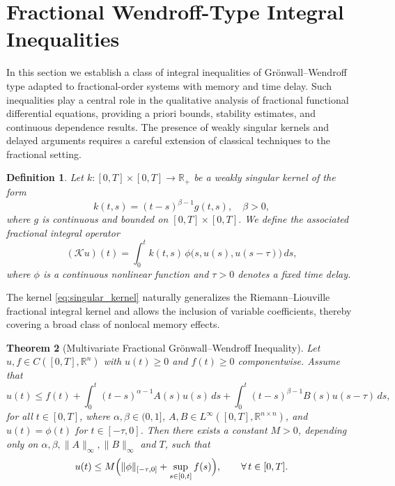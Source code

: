 \documentclass[12pt,a4paper]{article}
\newtheorem{theorem}{Theorem}[section]
\newtheorem{definition}[theorem]{Definition}
\numberwithin{equation}{section}
\begin{document}
	\section{Fractional Wendroff-Type Integral Inequalities}
	\label{sec:inequalities}
	
	In this section we establish a class of integral inequalities of Grönwall--Wendroff type adapted to fractional-order systems with memory and time delay. Such inequalities play a central role in the qualitative analysis of fractional functional differential equations, providing a priori bounds, stability estimates, and continuous dependence results. The presence of weakly singular kernels and delayed arguments requires a careful extension of classical techniques to the fractional setting.
	
	\begin{definition}
		Let $k: [0,T] \times [0,T] \to \mathbb{R}_+$ be a weakly singular kernel of the form
		\begin{equation}
			k(t,s) = (t-s)^{\beta-1} g(t,s), \quad \beta > 0,
			\label{eq:singular_kernel}
		\end{equation}
		where $g$ is continuous and bounded on $[0,T]\times[0,T]$. We define the associated fractional integral operator
		\begin{equation}
			(\mathcal{K}u)(t) = \int_0^t k(t,s)\,\phi\bigl(s,u(s),u(s-\tau)\bigr)\,ds,
			\label{eq:fractional_operator}
		\end{equation}
		where $\phi$ is a continuous nonlinear function and $\tau>0$ denotes a fixed time delay.
	\end{definition}
	
	The kernel \eqref{eq:singular_kernel} naturally generalizes the Riemann--Liouville fractional integral kernel and allows the inclusion of variable coefficients, thereby covering a broad class of nonlocal memory effects.
	
	\begin{theorem}[Multivariate Fractional Grönwall--Wendroff Inequality]
		\label{thm:main_ineq}
		Let $u,f \in C([0,T],\mathbb{R}^n)$ with $u(t)\ge 0$ and $f(t)\ge 0$ componentwise. Assume that
		\begin{equation}
			u(t) \le f(t) + \int_0^t (t-s)^{\alpha-1} A(s)u(s)\,ds + \int_0^t (t-s)^{\beta-1} B(s)u(s-\tau)\,ds,
			\label{eq:inequality_form}
		\end{equation}
		for all $t\in[0,T]$, where $\alpha,\beta\in(0,1]$, $A,B\in L^\infty([0,T],\mathbb{R}^{n\times n})$, and $u(t)=\phi(t)$ for $t\in[-\tau,0]$. Then there exists a constant $M>0$, depending only on $\alpha,\beta,\|A\|_\infty,\|B\|_\infty$ and $T$, such that
		\begin{equation}
			u(t) \le M\Bigl(\|\phi\|_{[-\tau,0]}+\sup_{s\in[0,t]}f(s)\Bigr), \qquad \forall\, t\in[0,T].
			\label{eq:inequality_result}
		\end{equation}
	\end{theorem}
	
\end{document}
